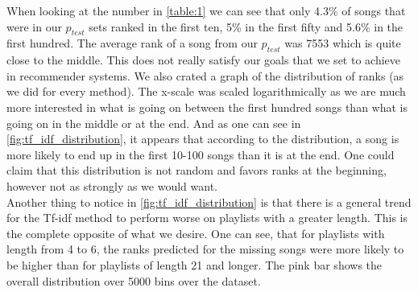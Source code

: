 When looking at the number in \ref{table:1} we can see that only 4.3\% of songs that were in our $p_{test}$ sets ranked in the first ten, 5\% in the first fifty and 5.6\% in the first hundred. The average rank of a song from our $p_{test}$ was 7553 which is quite close to the middle. This does not really satisfy our goals that we set to achieve in recommender systems. We also crated a graph of the distribution of ranks (as we did for every method). The x-scale was scaled logarithmically as we are much more interested in what is going on between the first hundred songs than what is going on in the middle or at the end. And as one can see in \ref{fig:tf_idf_distribution}, it appears that according to the distribution, a song is more likely to end up in the first 10-100 songs than it is at the end. One could claim that this distribution is not random and favors ranks at the beginning, however not as strongly as we would want.\\
Another thing to notice in \ref{fig:tf_idf_distribution} is that there is a general trend for the Tf-idf method to perform worse on playlists with a greater length. This is the complete opposite of what we desire. One can see, that for playlists with length from 4 to 6, the ranks predicted for the missing songs were more likely to be higher than for playlists of length 21 and longer. The pink bar shows the overall distribution over 5000 bins over the dataset. 

